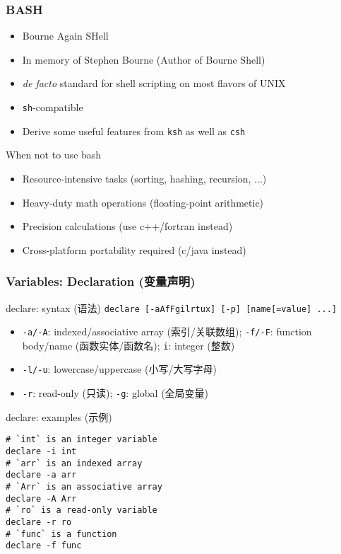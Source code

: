 \documentclass[red]{beamer}
\begin{document}
\begin{CJK*}{UTF8}{gbsn}
\begin{frame}
\frametitle{BASH}
\begin{itemize}
	\item Bourne Again SHell
	\item In memory of Stephen Bourne (Author of Bourne Shell)
	\item \emph{de facto} standard for shell scripting on most 
		flavors of UNIX
	\item \texttt{sh}-compatible
	\item Derive some useful features from \texttt{ksh} as well 
		as \texttt{csh} 
\end{itemize}
\begin{block}{\centering When not to use bash}
\begin{itemize}
	\item Resource-intensive tasks (sorting, hashing, recursion, ...)
	\item Heavy-duty math operations (floating-point arithmetic)
	\item Precision calculations (use c++/fortran instead)
	\item Cross-platform portability required (c/java instead)
\end{itemize}
\end{block}
\end{frame}


\begin{frame}
\frametitle{Variables: Declaration (变量声明)}
\begin{block}{\centering declare: syntax (语法)}
\lstinline{declare [-aAfFgilrtux] [-p] [name[=value] ...]}
\begin{itemize}
\footnotesize
	\item \texttt{-a/-A}: indexed/associative array (索引/关联数组); 
		\texttt{-f/-F}: function body/name (函数实体/函数名); \texttt{i}: integer (整数)
	\item \texttt{-l/-u}: lowercase/uppercase (小写/大写字母)
	\item \texttt{-r}: read-only (只读); \texttt{-g}: global (全局变量)
\end{itemize}
\end{block}
\begin{block}{\centering declare: examples (示例)}
\begin{lstlisting}
# `int` is an integer variable
declare -i int
# `arr` is an indexed array
declare -a arr
# `Arr` is an associative array
declare -A Arr
# `ro` is a read-only variable
declare -r ro
# `func` is a function
declare -f func
\end{lstlisting}
\end{block}
\end{frame}



\end{CJK*}
\end{document}
